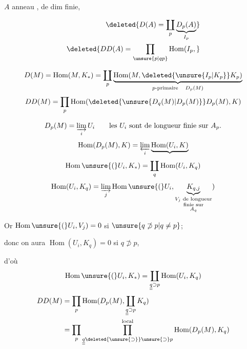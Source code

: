 $A$ anneau , de dim finie, 

\[
\begin{aligned}
\deleted{D(A)=\coprod_p\underbrace{D_p(A)}_{I_p}}\\
\deleted{DD(A)=\prod_{\unsure{p|qp}}\operatorname{Hom}(I_p,}
\end{aligned}
\]

\[
D(M)=\operatorname{Hom}(M,K_*)=\coprod_p
\underbrace{\operatorname{Hom}(M,\deleted{\unsure{I_p|K_p}}K_p)}_{p\text{-primaire}\quad D_p(M)}
\]
\[
DD(M)=\prod_p\operatorname{Hom}(\deleted{\unsure{D_q(M)|D_p(M)}}D_p(M),K)
\]

\[
D_p(M)=\varinjlim_i U_i
\qquad\text{les $U_i$ sont de longueur finie sur $A_p$.}
\]
\[
\operatorname{Hom}(D_p(M),K)=\varprojlim_i\underbrace{\operatorname{Hom}(U_i,K)}
\]
\[
\operatorname{Hom}\unsure{(}U_i,K_*)=\coprod_q\operatorname{Hom}(U_i,K_q)
\]
\[
\operatorname{Hom}(U_i,K_q)=\varinjlim_j\operatorname{Hom}\unsure{(}U_i,
\underbrace{K_{q,j}}_{\substack{V_j\text{ de longueur}\\\text{finie sur}\\A_q}})
\]


Or $\operatorname{Hom}\unsure{(}U_i,V_j)=0$ si $\unsure{q\not\supset p|q\ne p}$;

donc on aura $\operatorname{Hom}(U_i,K_q)=0$ si $q\not\supset p$,

d'où
\[
\operatorname{Hom}\unsure{(}U_i,K_*)=\coprod_{\underline{\underline q}\supset p}\operatorname{Hom}(U_i,K_q)
\]
\[
\begin{aligned}
DD(M)&=\prod_p\operatorname{Hom}(D_p(M),\coprod_{\underline{\underline q}\supset p}K_q)\\
&=\prod_p\prod_{\underline{\underline q}\deleted{\unsure{\supset}}\unsure{\supset}p}^{\mathrm{local}}\operatorname{Hom}(D_p(M),K_q)
\end{aligned}
\]

